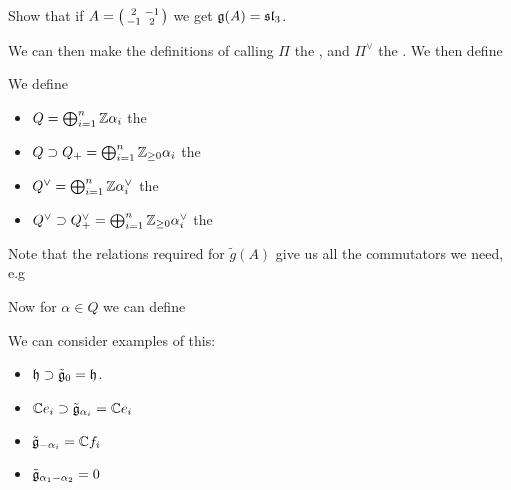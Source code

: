 \documentclass{article}
\begin{document}
\begin{ex}
Show that if $A = \begin{psmallmatrix} 2 & -1 \\ -1 & 2 \end{psmallmatrix} $ we get $\mathfrak{g}(A) = \mathfrak{sl}_3$. 
\end{ex}

We can then make the definitions of calling $\Pi$ the , and $\Pi^\vee$ the . We then define 

\begin{definition}
We define
\begin{itemize}
    \item $Q = \bigoplus_{i=1}^n \mathbb{Z}\alpha_i$ the 
    \item $Q \supset Q_+ = \bigoplus_{i=1}^n \mathbb{Z}_{\geq 0}\alpha_i$ the 
    \item $Q^\vee = \bigoplus_{i=1}^n \mathbb{Z}\alpha^\vee_i$ the 
    \item $Q^\vee \supset Q^\vee_+ = \bigoplus_{i=1}^n \mathbb{Z}_{\geq 0}\alpha^\vee_i$ the 
\end{itemize}
\end{definition}

Note that the relations required for $\tilde{g}(A)$ give us all the commutators we need, e.g 

Now for $\alpha \in Q$ we can define 


\begin{example}
We can consider examples of this:
\begin{itemize}
    \item $\mathfrak{h} \supset \tilde{\mathfrak{g}}_0 = \mathfrak{h}$.
    \item $\mathbb{C}e_i \supset \tilde{\mathfrak{g}}_{\alpha_i} = \mathbb{C}e_i$
    \item $\tilde{\mathfrak{g}}_{-\alpha_i} = \mathbb{C}f_i$
    \item $\tilde{\mathfrak{g}}_{\alpha_1 - \alpha_2} = 0$
\end{itemize}
\end{example}
\end{document}
